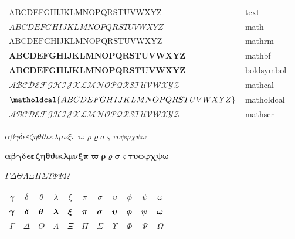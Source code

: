 \bigskip

\begin{tabular}{ll}
ABCDEFGHIJKLMNOPQRSTUVWXYZ & text \\
$ABCDEFGHIJKLMNOPQRSTUVWXYZ$ & math \\
$\mathrm{ABCDEFGHIJKLMNOPQRSTUVWXYZ}$ & mathrm \\
$\mathbf{ABCDEFGHIJKLMNOPQRSTUVWXYZ}$ & mathbf \\
$\boldsymbol{ABCDEFGHIJKLMNOPQRSTUVWXYZ}$ & boldsymbol \\
$\mathcal{ABCDEFGHIJKLMNOPQRSTUVWXYZ}$ & mathcal \\
$\matholdcal{ABCDEFGHIJKLMNOPQRSTUVWXYZ}$ & matholdcal \\
$\mathscr{ABCDEFGHIJKLMNOPQRSTUVWXYZ}$ & mathscr
\end{tabular}
\bigskip

$\alpha \beta \gamma \delta \epsilon \varepsilon \zeta \eta \theta \vartheta \iota \kappa \lambda \mu \nu \xi \pi \varpi \rho \varrho \sigma \varsigma \tau \upsilon \phi \varphi \chi \psi \omega$\par
$\boldsymbol{\alpha \beta \gamma \delta \epsilon \varepsilon \zeta \eta \theta \vartheta \iota \kappa \lambda \mu \nu \xi \pi \varpi \rho \varrho \sigma \varsigma \tau \upsilon \phi \varphi \chi \psi \omega}$\par
$\Gamma \Delta \Theta \Lambda \Xi \Pi \Sigma \Upsilon \Phi \Psi \Omega$\par

\bigskip
\begin{tabular}{ccccccccccc}
$\gamma$ & $\delta$ & $\theta$ & $\lambda$ & $\xi$ & $\pi$ & $\sigma$ & $\upsilon$ & $\phi$ & $\psi$ & $\omega$\\
$\boldsymbol{\gamma}$ & $\boldsymbol{\delta}$ & $\boldsymbol{\theta}$ & $\boldsymbol{\lambda}$ & $\boldsymbol{\xi}$ & $\boldsymbol{\pi}$ & $\boldsymbol{\sigma}$ & $\boldsymbol{\upsilon}$ & $\boldsymbol{\phi}$ & $\boldsymbol{\psi}$ & $\boldsymbol{\omega}$\\
$\Gamma$ & $\Delta$ & $\Theta$ & $\Lambda$ & $\Xi$ & $\Pi$ & $\Sigma$ & $\Upsilon$ & $\Phi$ & $\Psi$ & $\Omega$
\end{tabular}

\par\bigskip
